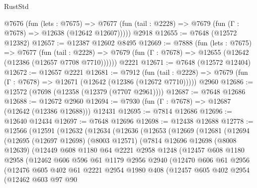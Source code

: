 \begin{lexlean}{RustStd}
\begin{coremodule}
{\begin{coremodule}
{{{{{{{{{{{{{{{{{{{{{{{{{{{{{{{{{{{{{{{{{{{{{{{{{{{{{    @7676
      (fun (lets : @7675) =>
      @7677 (fun (tail : @2228) => @7679 (fun (Γ : @7678) => @12638 (@12642 @12607)))))
    @2918
@12655 := @7648 (@12572 @12382)
@12657 := @12387 @12602 @8495
@12669 := @7888
    (fun (lets : @7675) =>
    @7677
      (fun (tail : @2228) =>
      @7679 (fun (Γ : @7678) => @12655 (@12642 (@12386 (@12657 @7708 @7710))))))
    @2221
@12671 := @7648 (@12572 @12404)
@12672 := @12657 @2221
@12681 := @7912
    (fun (tail : @2228) => @7679 (fun (Γ : @7678) => @12671 (@12642 (@12386 (@12672 @7710)))))
    @2960
@12686 := @12572 (@7698 (@12358 (@12379 (@7707 @2961))))
@12687 := @7648 @12686
@12688 := @12672 @2960
@12694 := @7930 (fun (Γ : @7678) => @12687 (@12642 (@12386 @12688))) @12431
@12695 := @7814 @12686
@12696 := @12640 @12434
@12697 := @7648 @12696
@12698 := @12438 @12688
@12778 := @12566
    (@12591
      (@12632
        (@12634
          (@12636
            (@12653
              (@12669
                (@12681
                  (@12694
                    (@12695
                      (@12697 @12698)
                      (@8003 @12571)
                      (@7814
                        @12696
                        @12698
                        (@8008 @12639)
                        (@12449
                          @608
                          @1180
                          @64
                          @2221
                          @2958
                          @1248
                          (@12457
                            @608
                            @1180
                            @2958
                            (@12462
                              @606
                              @596
                              @61
                              @1179
                              @2956
                              @2940
                              (@12470
                                @606
                                @61
                                @2956
                                (@12476
                                  @605
                                  @402
                                  @61
                                  @2221
                                  @2954
                                  @1980
                                  @408
                                  (@12457
                                    @605
                                    @402
                                    @2954
                                    (@12462
                                      @603
                                      @97
                                      @90
}}}}}}}}}}}}}}}}}}}}}}}}}}}}}}}}}}}}}}}}}}}}}}}}}}}}}
\end{coremodule}}
\end{coremodule}
\end{lexlean}
